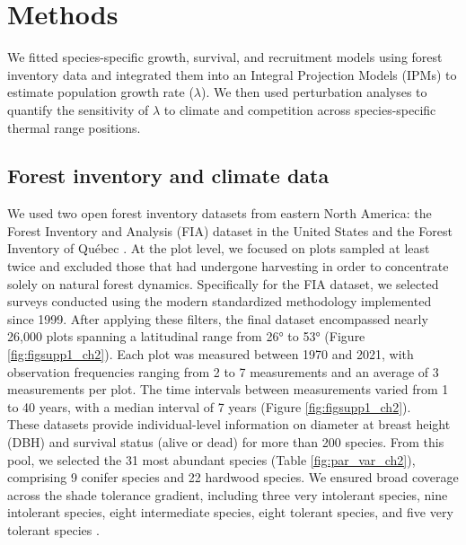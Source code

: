 \hypertarget{methods}{%
\section{Methods}\label{methods}}

We fitted species-specific growth, survival, and recruitment models
using forest inventory data and integrated them into an Integral
Projection Models (IPMs) to estimate population growth rate
(\(\lambda\)). We then used perturbation analyses to quantify the
sensitivity of \(\lambda\) to climate and competition across
species-specific thermal range positions.\\

\hypertarget{forest-inventory-and-climate-data}{%
\subsection{Forest inventory and climate
data}\label{forest-inventory-and-climate-data}}

We used two open forest inventory datasets from eastern North America:
the Forest Inventory and Analysis (FIA) dataset in the United States
\citep{OConnell2007} and the Forest Inventory of Québec
\citep{Naturelles2016}. At the plot level, we focused on plots sampled
at least twice and excluded those that had undergone harvesting in order
to concentrate solely on natural forest dynamics. Specifically for the
FIA dataset, we selected surveys conducted using the modern standardized
methodology implemented since 1999. After applying these filters, the
final dataset encompassed nearly 26,000 plots spanning a latitudinal
range from 26° to 53° (Figure \ref{fig:figsupp1_ch2}). Each plot was measured between 1970
and 2021, with observation frequencies ranging from 2 to 7 measurements
and an average of 3 measurements per plot. The time intervals between
measurements varied from 1 to 40 years, with a median interval of 7
years (Figure \ref{fig:figsupp1_ch2}).\\

These datasets provide individual-level information on diameter at
breast height (DBH) and survival status (alive or dead) for more than
200 species. From this pool, we selected the 31 most abundant species
(Table \ref{fig:par_var_ch2}), comprising 9 conifer species and 22 hardwood species. We
ensured broad coverage across the shade tolerance gradient, including
three very intolerant species, nine intolerant species, eight
intermediate species, eight tolerant species, and five very tolerant
species \citep{burns1990silvics}.\\

